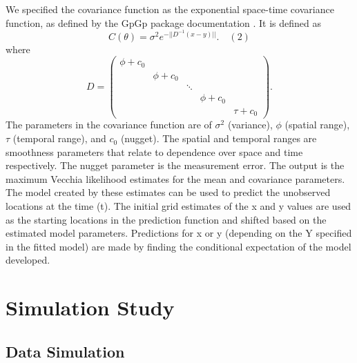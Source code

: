\documentclass[12pt]{article}
\begin{document}
We specified the covariance function as the exponential space-time
covariance function, as defined by the GpGp package documentation
\citep{gpgp_pkg}. It is defined as
\[C(\theta) = \sigma^2e^{-||D^{-1}(x-y)||}. \quad (2)\] where
\[D = \left(\begin{array}{ccccc} 
\phi + c_0 & \\
 & \phi + c_0\\
 &  & \ddots\\
 &  &  & \phi + c_0 \\
 &  &  &  &  \tau+c_0
\end{array}\right). \] The parameters in the covariance function are of
\(\sigma^2\) (variance), \(\phi\) (spatial range), \(\tau\) (temporal
range), and \(c_0\) (nugget). The spatial and temporal ranges are
smoothness parameters that relate to dependence over space and time
respectively. The nugget parameter is the measurement error. The output
is the maximum Vecchia likelihood estimates for the mean and covariance
parameters. The model created by these estimates can be used to predict
the unobserved locations at the time (t). The initial grid estimates of
the x and y values are used as the starting locations in the prediction
function and shifted based on the estimated model parameters.
Predictions for x or y (depending on the Y specified in the fitted
model) are made by finding the conditional expectation of the model
developed.

\hypertarget{simulation}{%
\section{Simulation Study}\label{simulation}}

\hypertarget{data-simulation}{%
\subsection{Data Simulation}\label{data-simulation}}
\end{document}
